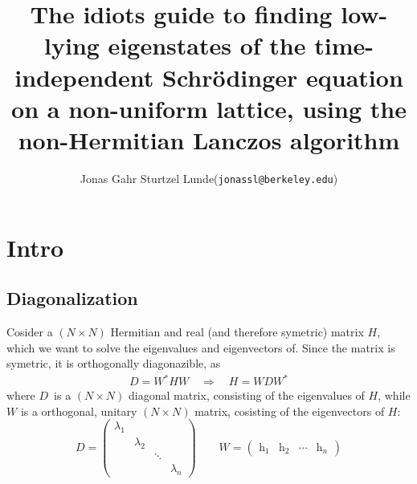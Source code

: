 \documentclass[12p,a4paper]{article}
\renewcommand{\b}[1]{\boldsymbol{\mathrm{#1}}}
\begin{document}
\title{The idiots guide to finding low-lying eigenstates of the time-independent Schrödinger equation on a non-uniform lattice, using the non-Hermitian Lanczos algorithm}
\author{
	\begin{tabular}{rl}
        Jonas Gahr Sturtzel Lunde & (\texttt{jonassl@berkeley.edu})
	\end{tabular}}
\maketitle



\section{Intro}
\subsection{Diagonalization}
Cosider a $(N\times N)$ Hermitian and real (and therefore symetric) matrix $H$, which we want to solve the eigenvalues and eigenvectors of. Since the matrix is symetric, it is orthogonally diagonazible, as
\begin{align}
    D = W^*HW \quad\Rightarrow\quad H = W D W^*
\end{align}
where $D$ is a $(N\times N)$ diagonal matrix, consisting of the eigenvalues of $H$, while $W$ is a orthogonal, unitary $(N\times N)$ matrix, cosisting of the eigenvectors of $H$:
\[
    D = \begin{pmatrix} \lambda_1 &           &         & \\
                                  & \lambda_2 &         & \\
                                  &           & \ddots  & \\
                                  &           &         & \lambda_n
        \end{pmatrix}
        \quad\quad
    W = \begin{pmatrix} \b h_1 & \b h_2 & \cdots & \b h_n \end{pmatrix}
\]
\end{document}
